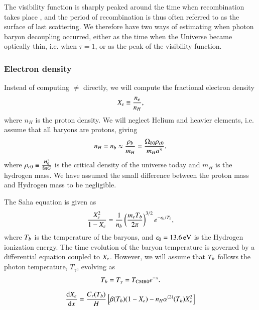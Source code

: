 The visibility function is sharply peaked around the time when recombination takes place , and the period of recombination is thus often referred to as the surface of last scattering. We therefore have two ways of estimating when photon baryon decoupling occurred, either as the time when the Universe became optically thin, i.e. when $\tau=1$, or as the peak of the visibility function.   

\subsubsection{Electron density } \label{sssec:M2_electron_density}
Instead of computing $\ne$ directly, we will compute the fractional electron density
\begin{equation} \label{eq:M2:theory:X_e_definition}
    X_e \equiv \frac{n_e}{n_H},
\end{equation}
where $n_H$ is the proton density. We will neglect Helium and heavier elements, i.e. assume that all baryons are protons, giving  
\begin{equation} \label{eq:M2:theory:helium_baryon_number_density}
    n_H=n_b \approx \frac{\rho_b}{m_H} = \frac{\Omega_{b0} \rho_{c0}}{m_H a^3},
\end{equation}
where $\rho_{c0}\equiv \frac{ H_0^2}{8\pi G}$ is the critical density of the universe today and $m_H$ is the hydrogen mass. We have assumed the small difference between the proton mass and Hydrogen mass to be negligible.


The Saha equation is given as 
\begin{equation} \label{eq:M2:theory:saha_equation}
    \frac{X_e^2}{1-X_e} = \frac{1}{n_b} \left( \frac{m_e T_b}{2\pi} \right)^{3/2} e^{-\epsilon_0 / T_b},
\end{equation}
where $T_b$ is the temperature of the baryons, and $\epsilon_0=13.6\,\mathrm{eV}$ is the Hydrogen ionization energy. The time evolution of the baryon temperature is governed by a differential equation coupled to $X_e$. However, we will assume that $T_b$ follows the photon temperature, $T_\gamma$, evolving as 
\begin{equation}
    T_b = T_\gamma = T_\mathrm{CMB0} e^{-x}.
\end{equation}



\begin{equation} \label{eq:M2:theory:Xe_peebles_ODE}
    \dv{X_e}{x} = \frac{C_r(T_b)}{H}\left[ \beta(T_b)(1-X_e) - n_H \alpha^{(2)}(T_b) X_e^2  \right]
\end{equation}


